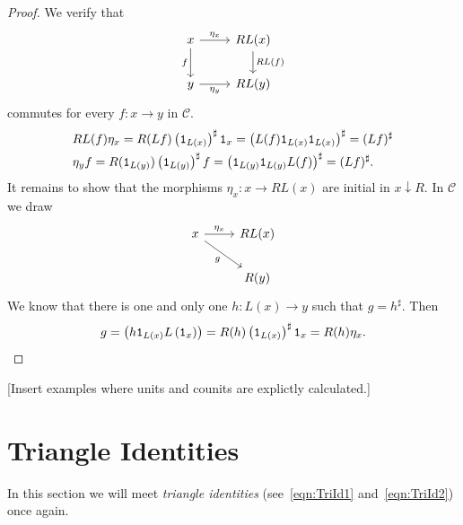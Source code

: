 \begin{proof}
  We verify that
  \[
    \begin{tikzcd}
      x \ar["{\eta_x}", r] \ar["f", d, swap] & RL(x) \ar["RL(f)", d] \\
      y \ar["{\eta_y}", r, swap] & RL(y)
    \end{tikzcd}
  \]
  commutes for every \(f : x \to y\) in \(\mathcal{C}\).
  \begin{align*}
    & RL(f) \eta_x = R(Lf) \left( \mathtt 1_{L(x)} \right)^\sharp \mathtt 1_x =
      \left( L(f) \mathtt 1_{L(x)} \mathtt 1_{L(x)} \right)^\sharp = (Lf)^\sharp \\
    & \eta_y f = R(\mathtt 1_{L(y)}) \left( \mathtt 1_{L(y)} \right)^\sharp f =
      \left(\mathtt 1_{L(y)} \mathtt 1_{L(y)} L(f) \right)^\sharp = (Lf)^\sharp .
  \end{align*}
  It remains to show that the morphisms \(\eta_x : x \to RL(x)\) are
  initial in \(x {\downarrow} R\). In \(\mathcal{C}\) we draw
  \[
    \begin{tikzcd}
      x \ar["{\eta_x}", r] \ar["g", dr, swap] & RL(x) \\
      & R(y)
    \end{tikzcd}
  \]
  We know that there is one and only one \(h : L(x) \to y\) such that
  \(g = h^\sharp\). Then
  \[
    g = \left( h \mathtt 1_{L(x)} L\left(\mathtt 1_x\right) \right) = R(h)
    \left(\mathtt 1_{L(x)} \right)^\sharp \mathtt 1_{x} = R(h) \eta_x . \qedhere
  \]
\end{proof}

{\color{red} [Insert examples where units and counits are explictly calculated.]}



\section{Triangle Identities}

In this section we will meet {\em triangle identities}
(see~\eqref{eqn:TriId1} and~\eqref{eqn:TriId2}) once again.

